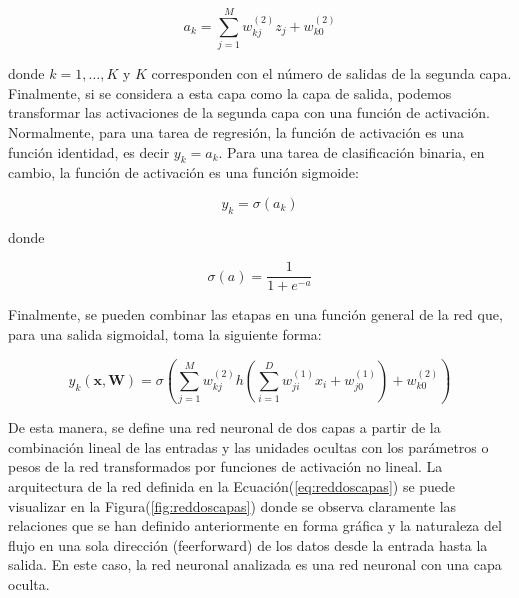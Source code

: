         \begin{equation}
            a_k = \sum_{j=1}^M w_{kj}^{(2)} z_j + w_{k0}^{(2)}
        \end{equation}

        donde $k = 1, \ldots, K$ y $K$ corresponden con el número de salidas de la segunda capa. Finalmente, si se considera a 
        esta capa como la capa de salida, podemos transformar las activaciones de la segunda capa con una función de activación. 
        Normalmente, para una tarea de regresión, la función de activación es una función identidad, es decir $y_k = a_k$. Para 
        una tarea de clasificación binaria, en cambio, la función de activación es una función sigmoide:

        \begin{equation}
            y_k = \sigma(a_k)
        \end{equation}

        donde
        
        \begin{equation}\label{eq:sigmoide}
            \sigma(a) = \frac{1}{1 + e^{-a}}    
        \end{equation}
        
        Finalmente, se pueden combinar las etapas en una función general de la red que, para una salida sigmoidal, toma la 
        siguiente forma:

        \begin{equation}\label{eq:reddoscapas}
            y_k(\mathbf{x}, \mathbf{W}) = \sigma \left( \sum_{j=1}^M w_{kj}^{(2)} h \left( \sum_{i=1}^D w_{ji}^{(1)} x_i + w_{j0}^{(1)} \right) + w_{k0}^{(2)} \right)
        \end{equation}

        De esta manera, se define una red neuronal de dos capas a partir de la combinación lineal de las entradas y las unidades 
        ocultas con los parámetros o pesos de la red transformados por funciones de activación no lineal. La arquitectura de la 
        red definida en la Ecuación(\ref{eq:reddoscapas}) se puede visualizar en la Figura(\ref{fig:reddoscapas}) donde se observa claramente las relaciones que se 
        han definido anteriormente en forma gráfica y la naturaleza del flujo en una sola dirección (feerforward) de los datos 
        desde la entrada hasta la salida. En este caso, la red neuronal analizada es una red neuronal con una capa oculta.

